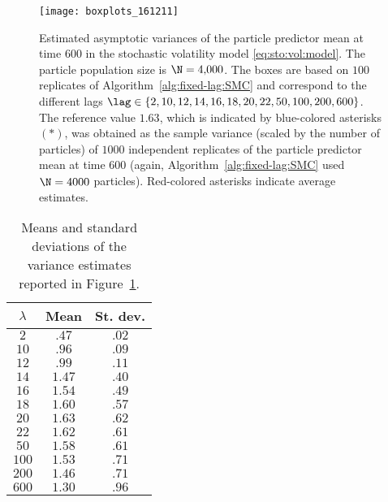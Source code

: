 \begin{figure}[H] 
    \centering
    \texttt{[image: boxplots\_161211]} %
    \caption{Estimated asymptotic variances of the particle predictor mean at time $600$ in the stochastic volatility model \eqref{eq:sto:vol:model}. The particle population size is $\N = 4,\!000$. The boxes are based on $100$ replicates of Algorithm~\ref{alg:fixed-lag:SMC} and correspond to the different lags $\lag \in \{2, 10, 12, 14, 16, 18, 20, 22, 50, 100, 200, 600\}$. The reference value $1.63$, which is indicated by blue-colored asterisks $(\ast)$, was obtained as the sample variance (scaled by the number of particles) of $1000$ independent replicates of the particle predictor mean at time $600$ (again, Algorithm~\ref{alg:fixed-lag:SMC} used $\N = 4000$ particles). Red-colored asterisks indicate average estimates.} \label{fig:boxplots:stovol}
\end{figure}

\begin{table}[H] \label{tab:lags:means:stds}
    \begin{center}
        \begin{tabular}{c|c|c} \toprule
            $\lambda$ & Mean & St. dev. \\ \midrule 
            $2$     & $.47$   & $.02$ \\
            $10$   & $.96$   & $.09$ \\ 
            $12$   & $.99$   & $.11$ \\
            $14$   & $1.47$& $.40$ \\
            $16$   & $1.54$ & $.49$ \\
            $18$   & $1.60$ & $.57$ \\
            $20$   & $1.63$ & $.62$ \\
            $22$   & $1.62$ & $.61$ \\
            $50$   & $1.58$ & $.61$ \\
            $100$ & $1.53$ & $.71$ \\
            $200$ & $1.46$ & $.71$ \\
            $600$ & $1.30$ & $.96$ \\
        \bottomrule
        \end{tabular} 
    \end{center}
    \caption{Means and standard deviations of the variance estimates reported in Figure~\ref{fig:boxplots:stovol}.} 
    \label{tab:lags:means:stds:stovol}
\end{table}


